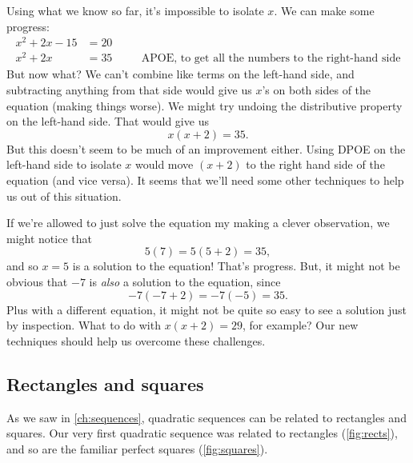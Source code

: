 Using what we know so far, it's impossible to isolate $x$. We can make some progress:
\[\begin{aligned}
x^2 + 2x - 15 &= 20
\\
x^2 + 2x &= 35
&&\quad\text{APOE, to get all the numbers to the right-hand side}
\end{aligned}\]
But now what? We can't combine like terms on the left-hand side, and subtracting anything from that side would give us $x$'s on both sides of the equation (making things worse). We might try undoing the distributive property on the left-hand side. That would give us
\[x(x+2)=35.\]
But this doesn't seem to be much of an improvement either. Using DPOE on the left-hand side to isolate $x$ would move $(x+2)$ to the right hand side of the equation (and vice versa). It seems that we'll need some other techniques to help us out of this situation.

If we're allowed to just solve the equation my making a clever observation, we might notice that \[5(7) = 5(5+2)=35,\] and so $x=5$ is a solution to the equation! That's progress. But, it might not be obvious that $-7$ is \textit{also} a solution to the equation, since \[-7(-7+2) = -7(-5) = 35.\] Plus with a different equation, it might not be quite so easy to see a solution just by inspection. What to do with $x(x+2)=29$, for example? Our new techniques should help us overcome these challenges.

\subsection{Rectangles and squares}

As we saw in \cref{ch:sequences}, quadratic sequences can be related to rectangles and squares. Our very first quadratic sequence was related to rectangles (\cref{fig:rects}), and so are the familiar perfect squares (\cref{fig:squares}).

